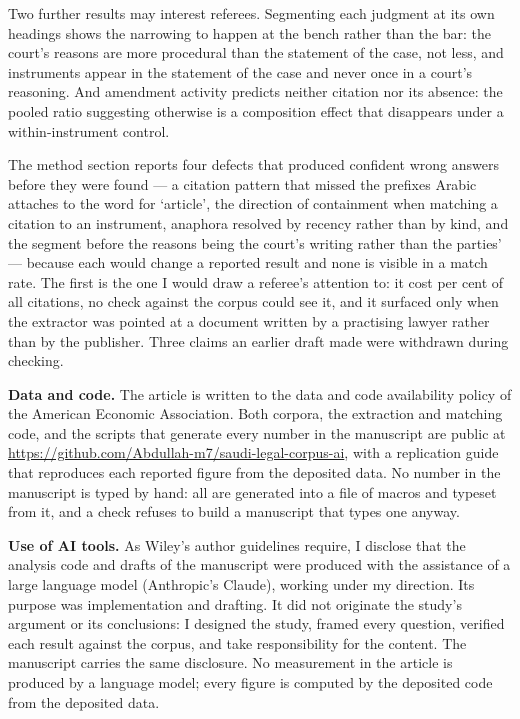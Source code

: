 \documentclass[10.5pt]{letter}
\begin{document}
\vspace{0.5em}
Two further results may interest referees. Segmenting each judgment at its
own headings shows the narrowing to happen at the bench rather than the bar:
the court's reasons are more procedural than the statement of the case, not
less, and \nRecitalOnlyInstruments{} instruments appear in the statement of
the case and never once in a court's reasoning. And amendment activity predicts neither citation nor
its absence: the pooled ratio suggesting otherwise is a composition effect
that disappears under a within-instrument control.

\vspace{0.5em}
The method section reports four defects that produced confident wrong answers
before they were found --- a citation pattern that missed the prefixes Arabic
attaches to the word for `article', the direction of containment when matching
a citation to an instrument, anaphora resolved by recency rather than by kind,
and the segment before the reasons being the court's writing rather than the
parties' --- because each would change a reported result and none is visible in
a match rate. The first is the one I would draw a referee's attention to: it
cost \nPrefixGapShare{} per cent of all citations, no check against the corpus
could see it, and it surfaced only when the extractor was pointed at a
document written by a practising lawyer rather than by the publisher. Three
claims an earlier draft made were withdrawn during checking.

\vspace{0.5em}
\textbf{Data and code.} The article is written to the data and code
availability policy of the American Economic Association. Both corpora, the extraction and
matching code, and the scripts that generate every number in the manuscript
are public at
\url{https://github.com/Abdullah-m7/saudi-legal-corpus-ai}, with a
replication guide that reproduces each reported figure from the deposited
data. No number in the manuscript is typed by hand: all are generated into a
file of macros and typeset from it, and a check refuses to build a manuscript
that types one anyway.

\vspace{0.5em}
\textbf{Use of AI tools.} As Wiley's author guidelines require, I disclose
that the analysis code and drafts of the manuscript were produced with the
assistance of a large language model (Anthropic's Claude), working under my
direction. Its purpose was implementation and drafting. It did not originate
the study's argument or its conclusions: I designed the study, framed every
question, verified each result against the corpus, and take responsibility
for the content. The manuscript carries the same disclosure. No measurement
in the article is produced by a language model; every figure is computed by
the deposited code from the deposited data.
\end{document}
